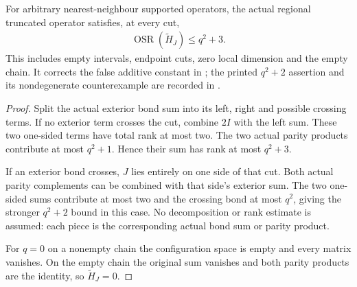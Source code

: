 \begin{lemma}
    \label{thm:physical_ff_regional_corrected_rank}
    \leanok
    For arbitrary nearest-neighbour supported operators, the actual
    regional truncated operator satisfies, at every cut,
    \begin{align*}
        \operatorname{OSR}(\widetilde H_J)\le q^2+3.
    \end{align*}
    This includes empty intervals, endpoint cuts, zero local dimension
    and the empty chain. It corrects the false additive constant in
    \cite[Section~6.1]{Arad2016RigorousRG}; the printed $q^2+2$ assertion
    and its nondegenerate counterexample are recorded in
    \cite{gap:alvv16_frustration_free_truncation_rank}.
\end{lemma}
\begin{proof}
    \leanok
    Split the actual exterior bond sum into its left, right and possible
    crossing terms. If no exterior term crosses the cut, combine $2I$
    with the left sum. These two one-sided terms have total rank at most
    two. The two actual parity products contribute at most $q^2+1$.
    Hence their sum has rank at most $q^2+3$.

    If an exterior bond crosses, $J$ lies entirely on one side of that
    cut. Both actual parity complements can be combined with that side's
    exterior sum. The two one-sided sums contribute at most two and the
    crossing bond at most $q^2$, giving the stronger $q^2+2$ bound in this
    case. No decomposition or rank estimate is assumed: each piece is
    the corresponding actual bond sum or parity product.

    For $q=0$ on a nonempty chain the configuration space is empty and
    every matrix vanishes. On the empty chain the original sum vanishes
    and both parity products are the identity, so $\widetilde H_J=0$.
\end{proof}
